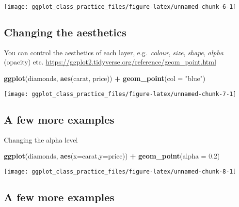 \documentclass[
]{article}
\newenvironment{Shaded}{\begin{snugshade}}{\end{snugshade}}
\newcommand{\AttributeTok}[1]{\textcolor[rgb]{0.13,0.29,0.53}{#1}}
\newcommand{\FloatTok}[1]{\textcolor[rgb]{0.00,0.00,0.81}{#1}}
\newcommand{\FunctionTok}[1]{\textcolor[rgb]{0.13,0.29,0.53}{\textbf{#1}}}
\newcommand{\NormalTok}[1]{#1}
\newcommand{\SpecialCharTok}[1]{\textcolor[rgb]{0.81,0.36,0.00}{\textbf{#1}}}
\newcommand{\StringTok}[1]{\textcolor[rgb]{0.31,0.60,0.02}{#1}}
\begin{document}
\begin{center}\texttt{[image: ggplot\_class\_practice\_files/figure-latex/unnamed-chunk-6-1]} \end{center}

\hypertarget{changing-the-aesthetics}{%
\subsection{Changing the aesthetics}\label{changing-the-aesthetics}}

You can control the aesthetics of each layer, e.g.~\emph{colour},
\emph{size}, \emph{shape}, \emph{alpha} (opacity) etc.
\url{https://ggplot2.tidyverse.org/reference/geom_point.html}

\begin{Shaded}
\begin{Highlighting}[]
\FunctionTok{ggplot}\NormalTok{(diamonds, }\FunctionTok{aes}\NormalTok{(carat, price)) }\SpecialCharTok{+} \FunctionTok{geom\_point}\NormalTok{(}\AttributeTok{col =} \StringTok{"blue"}\NormalTok{)}
\end{Highlighting}
\end{Shaded}

\begin{center}\texttt{[image: ggplot\_class\_practice\_files/figure-latex/unnamed-chunk-7-1]} \end{center}

\hypertarget{a-few-more-examples}{%
\subsection{A few more examples}\label{a-few-more-examples}}

Changing the alpha level

\begin{Shaded}
\begin{Highlighting}[]
\FunctionTok{ggplot}\NormalTok{(diamonds, }\FunctionTok{aes}\NormalTok{(}\AttributeTok{x=}\NormalTok{carat,}\AttributeTok{y=}\NormalTok{price)) }\SpecialCharTok{+} \FunctionTok{geom\_point}\NormalTok{(}\AttributeTok{alpha =} \FloatTok{0.2}\NormalTok{)}
\end{Highlighting}
\end{Shaded}

\begin{center}\texttt{[image: ggplot\_class\_practice\_files/figure-latex/unnamed-chunk-8-1]} \end{center}

\hypertarget{a-few-more-examples-1}{%
\subsection{A few more examples}\label{a-few-more-examples-1}}
\end{document}
